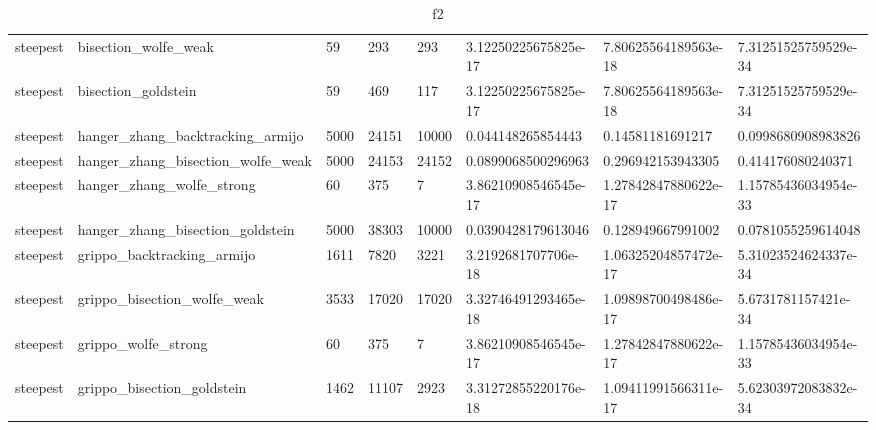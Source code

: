\documentclass[a4paper,11pt]{article}
\numberwithin{equation}{section} %
\begin{document}
\begin{table}[h!]
{\begin{tabular}{|l|l|l|l|l|l|l|l|}
        steepest & bisection\_wolfe\_weak & 59 & 293 & 293 & 3.12250225675825e-17 & 7.80625564189563e-18 & 7.31251525759529e-34 \\
        steepest & bisection\_goldstein & 59 & 469 & 117 & 3.12250225675825e-17 & 7.80625564189563e-18 & 7.31251525759529e-34 \\
        steepest & hanger\_zhang\_backtracking\_armijo & 5000 & 24151 & 10000 & 0.044148265854443 & 0.14581181691217 & 0.0998680908983826 \\
        steepest & hanger\_zhang\_bisection\_wolfe\_weak & 5000 & 24153 & 24152 & 0.0899068500296963 & 0.296942153943305 & 0.414176080240371 \\
        steepest & hanger\_zhang\_wolfe\_strong & 60 & 375 & 7 & 3.86210908546545e-17 & 1.27842847880622e-17 & 1.15785436034954e-33 \\
        steepest & hanger\_zhang\_bisection\_goldstein & 5000 & 38303 & 10000 & 0.0390428179613046 & 0.128949667991002 & 0.0781055259614048 \\
        steepest & grippo\_backtracking\_armijo & 1611 & 7820 & 3221 & 3.2192681707706e-18 & 1.06325204857472e-17 & 5.31023524624337e-34 \\
        steepest & grippo\_bisection\_wolfe\_weak & 3533 & 17020 & 17020 & 3.32746491293465e-18 & 1.09898700498486e-17 & 5.6731781157421e-34 \\
        steepest & grippo\_wolfe\_strong & 60 & 375 & 7 & 3.86210908546545e-17 & 1.27842847880622e-17 & 1.15785436034954e-33 \\
        steepest & grippo\_bisection\_goldstein & 1462 & 11107 & 2923 & 3.31272855220176e-18 & 1.09411991566311e-17 & 5.62303972083832e-34 \\

\end{tabular}}
\caption{f2}
\label{table:f2}
\end{table}
\end{document}
